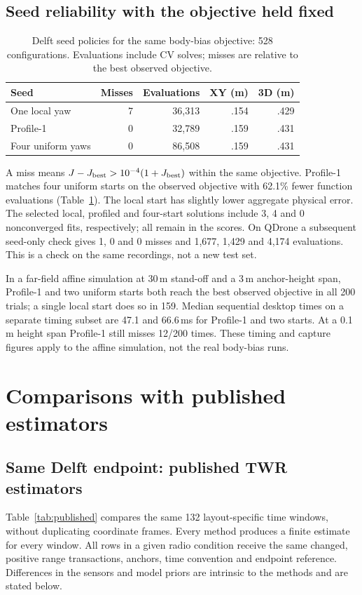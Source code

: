 \documentclass[conference,letterpaper,10pt]{IEEEtran}
\begin{document}
\subsection{Seed reliability with the objective held fixed}
\begin{table}[t]
\caption{Delft seed policies for the same body-bias objective: 528 configurations. Evaluations include CV solves; misses are relative to the best observed objective.}
\label{tab:seed}\centering\small\setlength{\tabcolsep}{4.5pt}
\begin{tabular}{lrrrr}
\toprule Seed&Misses&Evaluations&XY (m)&3D (m)\\\midrule
One local yaw&7&36,313&.154&.429\\
Profile-1&0&32,789&.159&.431\\
Four uniform yaws&0&86,508&.159&.431\\\bottomrule
\end{tabular}
\end{table}
A miss means $J-J_{\rm best}>10^{-4}(1+J_{\rm best})$ within the same objective. Profile-1 matches four uniform starts on the observed objective with 62.1\% fewer function evaluations (Table~\ref{tab:seed}). The local start has slightly lower aggregate physical error. The selected local, profiled and four-start solutions include 3, 4 and 0 nonconverged fits, respectively; all remain in the scores. On QDrone a subsequent seed-only check gives 1, 0 and 0 misses and 1,677, 1,429 and 4,174 evaluations. This is a check on the same recordings, not a new test set.

In a far-field affine simulation at 30\,m stand-off and a 3\,m anchor-height span, Profile-1 and two uniform starts both reach the best observed objective in all 200 trials; a single local start does so in 159. Median sequential desktop times on a separate timing subset are 47.1 and 66.6\,ms for Profile-1 and two starts. At a 0.1\,m height span Profile-1 still misses 12/200 times. These timing and capture figures apply to the affine simulation, not the real body-bias runs.
\section{Comparisons with published estimators}
\subsection{Same Delft endpoint: published TWR estimators}
Table~\ref{tab:published} compares the same 132 layout-specific time windows, without duplicating coordinate frames. Every method produces a finite estimate for every window. All rows in a given radio condition receive the same changed, positive range transactions, anchors, time convention and endpoint reference. Differences in the sensors and model priors are intrinsic to the methods and are stated below.
\end{document}

